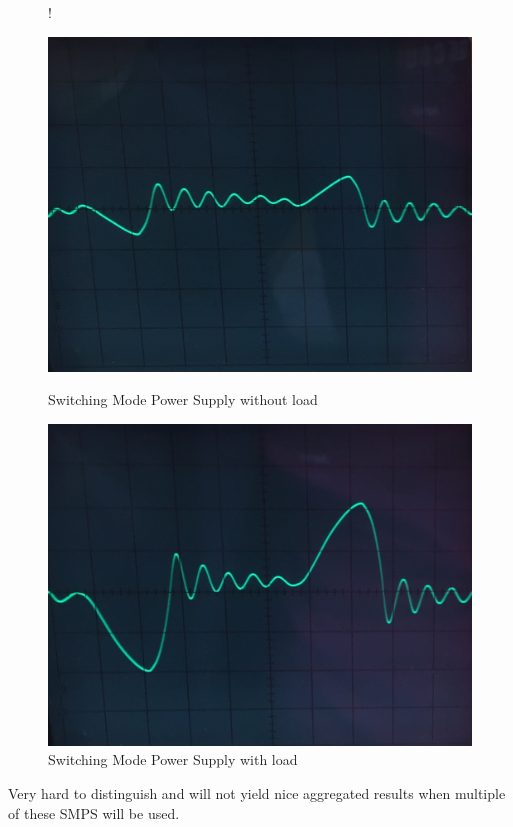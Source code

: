 \documentclass{beamer}
\begin{document}
\begin{frame}
		\begin{figure}
			 {!} {
			  \centering
			  \begin{minipage}[b]{0.48\textwidth}
			    \includegraphics[width=\textwidth]{../chapters/hardware-chapters/smps-current-primary-no-load-cropped.jpg}
			    \caption{Switching Mode Power Supply without load}
			  \end{minipage}
			  \hfill
			  \begin{minipage}[b]{0.48\textwidth}
			    \includegraphics[width=\textwidth]{../chapters/hardware-chapters/smps-current-primary-with-load-cropped.jpg}
			    \caption{Switching Mode Power Supply with load}
			  \end{minipage}
		  }
		\end{figure}

		Very hard to distinguish and will not yield nice aggregated results when multiple of these SMPS will be used.
		
	\end{frame}
\end{document}
